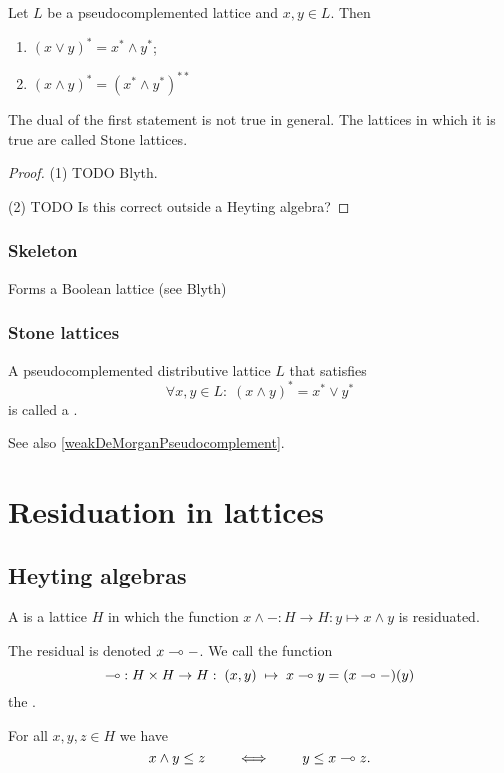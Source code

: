 \begin{proposition} \label{weakDeMorganPseudocomplement}
Let $L$ be a pseudocomplemented lattice and $x,y\in L$. Then
\begin{enumerate}
\item $(x\vee y)^* = x^* \wedge y^*$;
\item $(x\wedge y)^* = (x^* \wedge y^*)^{**}$
\end{enumerate}
\end{proposition}
The dual of the first statement is not true in general. The lattices in which it is true are called Stone lattices.
\begin{proof}
(1) TODO Blyth.

(2) TODO Is this correct outside a Heyting algebra?
\end{proof}

\subsubsection{Skeleton}
Forms a Boolean lattice (see Blyth)

\subsubsection{Stone lattices}
\begin{definition}
A pseudocomplemented distributive lattice $L$ that satisfies
\[ \forall x,y\in L: \; (x\wedge y)^* = x^* \vee y^* \]
is called a .
\end{definition}
See also \ref{weakDeMorganPseudocomplement}.

\section{Residuation in lattices}
\subsection{Heyting algebras}
\begin{definition}
A  is a lattice $H$ in which the function $x\wedge -: H\to H: y\mapsto x\wedge y$ is residuated.

The residual is denoted $x \multimap -$. We call the function
\[ \multimap\;: H\times H \to H: \; (x,y) \; \mapsto \; x\multimap y = (x\multimap -)(y) \]
the .
\end{definition}
For all $x,y,z\in H$ we have
\[ x\wedge y \leq z \qquad\iff\qquad y\leq x\multimap z. \]

